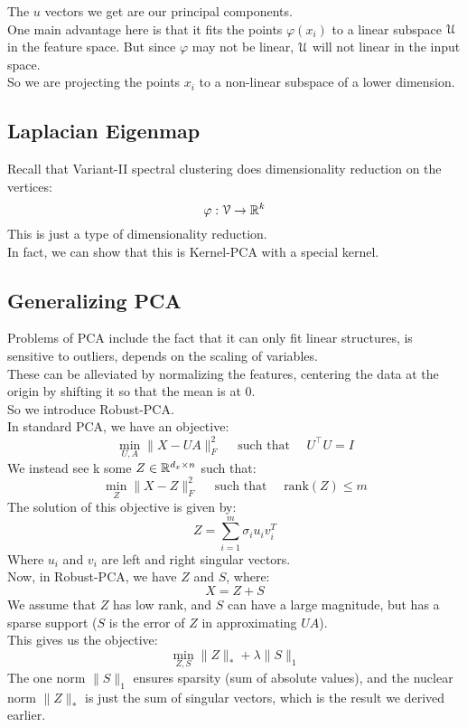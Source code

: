 \documentclass[12pt]{article}
\begin{document}
The $u$ vectors we get are our principal components. \\

One main advantage here is that it fits the points
$\varphi(x_i)$ to a linear subspace $\mathcal{U}$ in the
feature space. But since $\varphi$
may not be linear, $\mathcal{U}$
will not linear in the input space. \\
So we are projecting the points $x_i$ to a non-linear
subspace of a lower dimension. \\

\newpage

\subsection*{Laplacian Eigenmap}

Recall that Variant-II spectral clustering does
dimensionality reduction on the vertices:
\[ \varphi: \mathcal{V} \to \mathbb{R}^k \]
This is just a type of dimensionality reduction. \\

In fact, we can show that this is Kernel-PCA with
a special kernel. \\

\newpage

\subsection*{Generalizing PCA}

Problems of PCA include the fact that it can only
fit linear structures, is sensitive to outliers,
depends on the scaling of variables. \\
These can be alleviated by normalizing the features,
centering the data at the origin by shifting it
so that the mean is at $0$. \\

So we introduce Robust-PCA. \\

In standard PCA, we have an objective:
\[ \min_{U, A} \| X - UA \|_F^2 \quad 
\text{ such that } \quad U^\top U = I \]
We instead see k some $Z \in \mathbb{R}^{d_x \times n}$ 
such that:
\[ \min_Z \|X - Z\|^2_F \quad \text{ such that }
\quad \text{rank}(Z) \leq m \]
The solution of this objective is given by:
\[Z = \sum_{i=1}^m \sigma_i u_iv_i^T \]
Where $u_i$ and $v_i$ are left and right singular
vectors. \\

Now, in Robust-PCA, we have $Z$ and $S$,
where:
\[ X = Z + S \]
We assume that $Z$ has low rank, and $S$
can have a large magnitude, but has a sparse support
($S$ is the error of $Z$ in approximating $UA$). \\
This gives us the objective:
\[ \min_{Z, S} \|Z\|_* + \lambda \|S\|_1 \]
The one norm $\|S\|_1$ ensures sparsity
(sum of absolute values),
and the nuclear norm $\|Z\|_*$
is just the sum of singular vectors,
which is the result we derived earlier. \\
\end{document}
